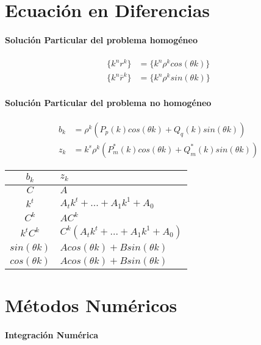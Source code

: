 \documentclass[a4paper]{article}
\begin{document}
\begin{multicols}{2}
    \section{Ecuación en Diferencias}

      \paragraph{Solución Particular del problema homogéneo}

        \begin{align*}
          \{k^nr^k \}&= \{k^n\rho^k cos(\theta k)\}\\
          \{k^n\bar{r}^k \} &=\{k^n\rho^k sin(\theta k)\}
        \end{align*}

      \paragraph{Solución Particular del problema no homogéneo}

        \begin{align*}
          b_k &= \rho^k(P_p(k) cos(\theta k) + Q_q(k) sin(\theta k ))\\
          z_k &= k^s\rho^k(P^*_m(k) cos(\theta k) + Q^*_m(k) sin(\theta k ))
        \end{align*}

        \begin{tabular}{c | l}
          $b_k$ & $z_k$ \\ \hline
          $C$ & $A$ \\
          $k^t$ & $A_tk^t + ... + A_1k^1 + A_0$ \\
          $C^k$ & $AC^k$ \\
          $k^tC^k$ & $C^k(A_tk^t + ... + A_1k^1 + A_0)$\\
          $sin(\theta k)$ & $Acos(\theta k) + Bsin(\theta k)$ \\
          $cos(\theta k)$ & $Acos(\theta k) + Bsin(\theta k)$
        \end{tabular}


    \section{Métodos Numéricos}

      \paragraph{Integración Numérica}


\end{multicols}
\end{document}
